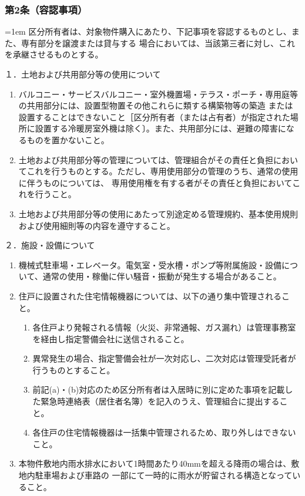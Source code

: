 \documentclass[
  twoside,
  luatex,
  paper=a4paper,
  fontsize=11pt,
  jafontsize=11pt,
  jlreq_notes,
]{jlreq}
\newcommand{\joumain}[1]{%
  \noindent\hangindent=1em\hangafter=1
  \hspace{1em}#1%
}
\begin{document}
  \subsubsection*{第2条（容認事項）}
  \joumain{区分所有者は、対象物件購入にあたり、下記事項を容認するものとし、また、専有部分を譲渡または貸与する
  場合においては、当該第三者に対し、これを承継させるものとする。}

  \noindent
  １．土地および共用部分等の使用について
  \begin{enumerate}
    \item バルコニー・サービスバルコニー・室外機置場・テラス・ポーチ・専用庭等の共用部分には、設置型物置その他これらに類する構築物等の築造
    または設置することはできないこと［区分所有者（または占有者）が指定された場所に設置する冷暖房室外機は除く〕。また、共用部分には、避難の障害になるものを置かないこと。
    \item 土地および共用部分等の管理については、管理組合がその責任と負担においてこれを行うものとする。ただし、専用使用部分の管理のうち、通常の使用に伴うものについては、
          専用使用権を有する者がその責任と負担においてこれを行うこと。
    \item 土地および共用部分等の使用にあたって別途定める管理規約、基本使用規則および使用細則等の内容を遵守すること。
  \end{enumerate}
  ２．施設・設備について
  \begin{enumerate}
  \item 機械式駐車場・エレベータ。電気室・受水槽・ポンプ等附属施設・設備について、通常の使用・稼働に伴い騒音・振動が発生する場合があること。
  \item 住戸に設置された住宅情報機器については、以下の通り集中管理されること。
  \begin{enumerate}
    \item 各住戸より発報される情報（火災、非常通報、ガス漏れ）は管理事務室を経由し指定警備会社に送信されること。
    \item 異常発生の場合、指定警備会社が一次対応し、二次対応は管理受託者が行うものとすること。
    \item 前記(a)・(b)対応のため区分所有者は入居時に別に定めた事項を記載した緊急時連絡表（居住者名簿）を記入のうえ、管理組合に提出すること。
    \item 各住戸の住宅情報機器は一括集中管理されるため、取り外しはできないこと。
  \end{enumerate}
  \item 本物件敷地内雨水排水において1時間あたり40mmを超える降雨の場合は、敷地内駐車場および車路の
        一部にて一時的に雨水が貯留される構造となっていること。
  \end{enumerate}
\end{document}
